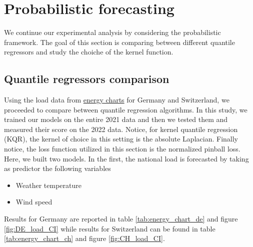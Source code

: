 \section{Probabilistic forecasting}
We continue our experimental analysis by considering the probabilistic framework. The goal of this section is comparing between different quantile regressors and study the choiche of the kernel function.

\subsection{Quantile regressors comparison}
Using the load data from \href{https://www.energy-charts.info/index.html?l=en&c=DE}{energy charts} for Germany and Switzerland, we proceeded to compare between quantile regression algorithms. In this study, we trained our models on the entire 2021 data and then we tested them and measured their score on the 2022 data.
Notice, for kernel quantile regression (KQR), the kernel of choice in this setting is the absolute Laplacian. Finally notice, the loss function utilized in this section is the normalized pinball loss. 
Here, we built two models. In the first, the national load is forecasted by taking as predictor the following variables
\begin{itemize}
    \item Weather temperature
    \item Wind speed
\end{itemize}
Results for Germany are reported in table \ref{tab:energy_chart_de} and figure \ref{fig:DE_load_CI} while results for Switzerland can be found in table \ref{tab:energy_chart_ch} and figure \ref{fig:CH_load_CI}.

